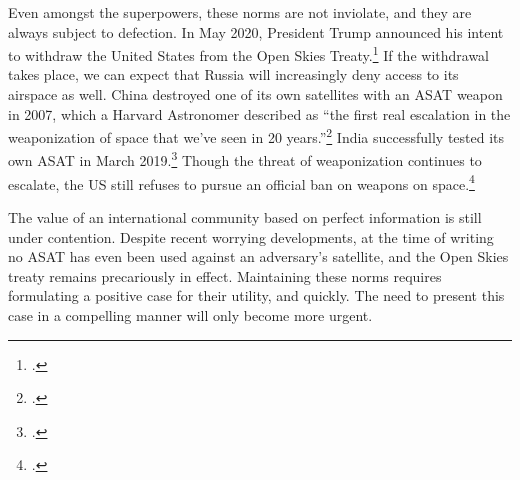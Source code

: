 \documentclass[14pt]{extarticle}
\begin{document}
Even amongst the superpowers, these norms are not inviolate, and they are always subject to defection. In May 2020, President Trump announced his intent to withdraw the United States from the Open Skies Treaty.\footcite{sanger_trump_2020} If the withdrawal takes place, we can expect that Russia will increasingly deny access to its airspace as well. China destroyed one of its own satellites with an ASAT weapon in 2007, which a Harvard Astronomer described as ``the first real escalation in the weaponization of space that we’ve seen in 20 years.''\footcite{broad_china_2007} India successfully tested its own ASAT in March 2019.\footcite{gettleman_india_2019} Though the threat of weaponization continues to escalate, the US still refuses to pursue an official ban on weapons on space.\footcite{oconnor_u.s._2019}

The value of an international community based on perfect information is still under contention. Despite recent worrying developments, at the time of writing no ASAT has even been used against an adversary's satellite, and the Open Skies treaty remains precariously in effect. Maintaining these norms requires formulating a positive case for their utility, and quickly. The need to present this case in a compelling manner will only become more urgent.
\end{document}
